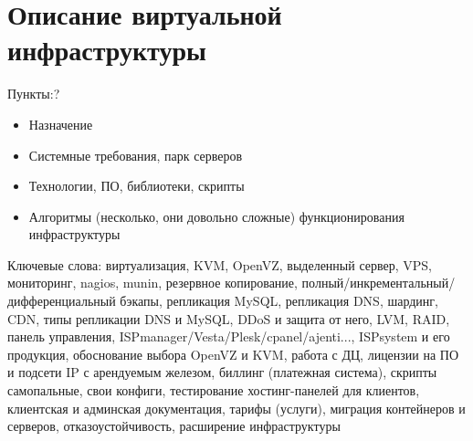 \section{Описание виртуальной инфраструктуры}

Пункты:?
\begin{itemize}
  \item Назначение
  \item Системные требования, парк серверов
  \item Технологии, ПО, библиотеки, скрипты
  \item Алгоритмы (несколько, они довольно сложные) функционирования инфраструктуры 
\end{itemize}

Ключевые слова:
виртуализация,
KVM,
OpenVZ,
выделенный сервер,
VPS,
мониторинг,
nagios,
munin,
резервное копирование,
полный/инкрементальный/дифференциальный бэкапы,
репликация MySQL,
репликация DNS,
шардинг,
CDN,
типы репликации DNS и MySQL,
DDoS и защита от него,
LVM,
RAID,
панель управления,
ISPmanager/Vesta/Plesk/cpanel/ajenti...,
ISPsystem и его продукция,
обоснование выбора OpenVZ и KVM,
работа с ДЦ,
лицензии на ПО и подсети IP с арендуемым железом,
биллинг (платежная система),
скрипты самопальные,
свои конфиги,
тестирование хостинг-панелей для клиентов,
клиентская и админская документация,
тарифы (услуги),
миграция контейнеров и серверов,
отказоустойчивость,
расширение инфраструктуры

\clearpage
